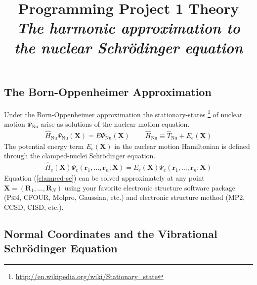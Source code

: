 \documentclass[11pt]{article}
\title{Programming Project 1 Theory\\
\textit{The harmonic approximation to the nuclear Schr\"odinger equation}}
\date{}
\author{}
\newcommand{\bo}[1]{\ensuremath{\mathbf{#1}}}
\renewcommand{\sp}{\ \ \ \ \ \ \ \ \ \ }
\newcommand{\ld}{\ensuremath{\ldots}}
\newcommand{\Nu}{\ensuremath{\mathrm{Nu}}}
\newcommand{\op}[1]{\ensuremath{\hat{#1}}}
\newcommand{\Y}{\ensuremath{\Psi}}
\begin{document}
\maketitle
\vspace{-2cm}

\subsection*{The Born-Oppenheimer Approximation}
Under the Born-Oppenheimer approximation the stationary-states
\footnote{\url{http://en.wikipedia.org/wiki/Stationary_state}} of nuclear
motion $\Y_\Nu$ arise as solutions of the nuclear motion equation.
\begin{align}
\label{pes}
    \op{H}_\Nu
    \Y_\Nu(\bo{X})
=
    E
    \Y_\Nu(\bo{X})
\sp
    \op{H}_\Nu
\equiv
    \op{T}_\Nu+E_e(\bo{X})
\end{align}
The potential energy term $E_e(\bo{X})$ in the nuclear motion Hamiltonian is
defined through the clamped-nuclei Schr\"odinger equation.
\begin{align}
\label{clamped-se}
    \op{H}_e(\bo{X})
    \Y_e(\bo{r}_1,\ld,\bo{r}_n;\bo{X})
=
    E_e(\bo{X})
    \Y_e(\bo{r}_1,\ld,\bo{r}_n;\bo{X})
\end{align}
Equation (\ref{clamped-se}) can be solved approximately at any point
$\bo{X}=(\bo{R}_1,\ld,\bo{R}_N)$ using your favorite electronic structure
software package (\textsc{Psi4}, CFOUR, Molpro, Gaussian, etc.) and electronic
structure method (MP2, CCSD, CISD, etc.).


\subsection*{Normal Coordinates and the Vibrational Schr\"odinger Equation}
\end{document}
